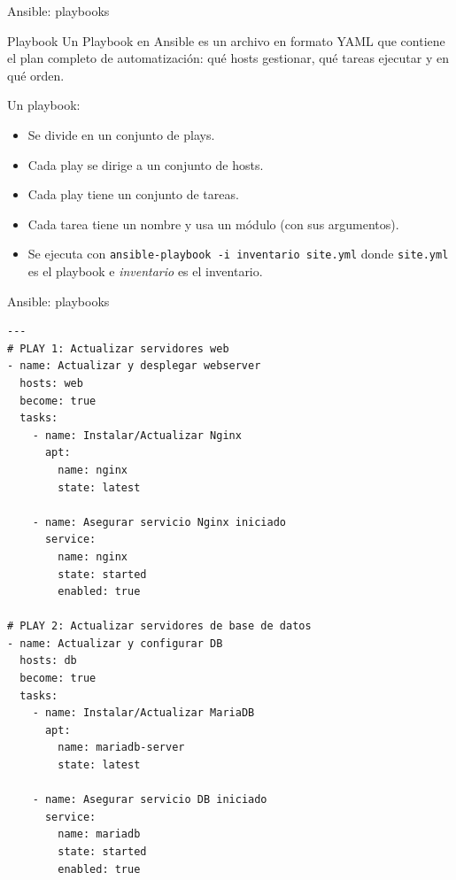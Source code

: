 \documentclass{beamer}
\begin{document}
\begin{frame}[fragile]{Ansible: playbooks}

\begin{block}{Playbook}
Un Playbook en Ansible es un archivo en formato YAML que contiene el plan completo de automatización:
qué hosts gestionar, qué tareas ejecutar y en qué orden.
\end{block}

Un playbook:

\begin{itemize}
    \item Se divide en un conjunto de plays.
    \item Cada play se dirige a un conjunto de hosts.
    \item Cada play tiene un conjunto de tareas.
    \item Cada tarea tiene un nombre y usa un módulo (con sus argumentos).
    \item Se ejecuta con \texttt{ansible-playbook -i inventario site.yml} donde \texttt{site.yml} es el playbook e \textit{inventario} es el inventario.
\end{itemize}



    
\end{frame}

\begin{frame}[fragile]{Ansible: playbooks}

\begin{verbatim}
---
# PLAY 1: Actualizar servidores web
- name: Actualizar y desplegar webserver
  hosts: web
  become: true
  tasks:
    - name: Instalar/Actualizar Nginx
      apt:
        name: nginx
        state: latest

    - name: Asegurar servicio Nginx iniciado
      service:
        name: nginx
        state: started
        enabled: true

# PLAY 2: Actualizar servidores de base de datos
- name: Actualizar y configurar DB
  hosts: db
  become: true
  tasks:
    - name: Instalar/Actualizar MariaDB
      apt:
        name: mariadb-server
        state: latest

    - name: Asegurar servicio DB iniciado
      service:
        name: mariadb
        state: started
        enabled: true
\end{verbatim}
    
\end{frame}
\end{document}
